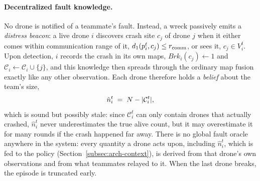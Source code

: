 \paragraph{Decentralized fault knowledge.}
No drone is notified of a teammate's fault. Instead, a wreck passively emits a
\emph{distress beacon}: a live drone $i$ discovers crash site $c_j$ of drone $j$
when it either comes within communication range of it,
$d_1(p_i^t, c_j) \le r_{\mathrm{comm}}$, or sees it, $c_j \in V_i^t$. Upon detection, $i$
records the crash in its own maps, $\mathit{Brk}_i(c_j) \leftarrow 1$ and
$\mathcal{C}_i \leftarrow \mathcal{C}_i \cup \{j\}$, and this knowledge then
spreads through the ordinary map fusion exactly like any other observation. Each
drone therefore holds a \emph{belief} about the team's size,
\[
\hat{n}_i^t \;=\; N - \lvert \mathcal{C}_i^t \rvert ,
\]
which is sound but possibly stale: since $\mathcal{C}_i^t$ can only contain
drones that actually crashed, $\hat{n}_i^t$ never underestimates the true alive
count, but it may overestimate it for many rounds if the crash happened far away.
There is no global fault oracle anywhere in the system: every quantity a drone
acts upon, including $\hat{n}_i^t$, which is fed to the policy
(Section~\ref{subsec:arch-context}), is derived from that drone's own
observations and from what teammates relayed to it. When the last drone breaks,
the episode is truncated early.

